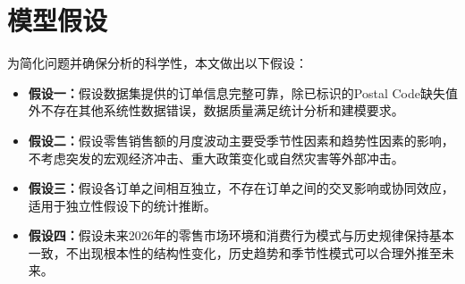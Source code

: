 

\section{模型假设}

为简化问题并确保分析的科学性，本文做出以下假设：

\begin{itemize}
  \item \textbf{假设一：}假设数据集提供的订单信息完整可靠，除已标识的Postal Code缺失值外不存在其他系统性数据错误，数据质量满足统计分析和建模要求。
  \item \textbf{假设二：}假设零售销售额的月度波动主要受季节性因素和趋势性因素的影响，不考虑突发的宏观经济冲击、重大政策变化或自然灾害等外部冲击。
  \item \textbf{假设三：}假设各订单之间相互独立，不存在订单之间的交叉影响或协同效应，适用于独立性假设下的统计推断。
  \item \textbf{假设四：}假设未来2026年的零售市场环境和消费行为模式与历史规律保持基本一致，不出现根本性的结构性变化，历史趋势和季节性模式可以合理外推至未来。
\end{itemize}
